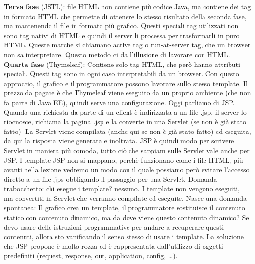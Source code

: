 \textbf{Terva fase} (JSTL): file HTML non contiene più codice Java, ma contiene dei tag in formato HTML che permette di ottenere lo stesso risultato della seconda fase, ma mantenendo il file in formato più grafico. Questi speciali tag utilizzati non sono tag nativi di HTML e quindi il server li processa per trasformarli in puro HTML. Queste marche si chiamano active tag o run-at-server tag, che un browser non sa interpretare. Questo metodo ci da l'illusione di lavorare con HTML.\newline
\newline
\textbf{Quarta fase} (Thymeleaf): Contiene solo tag HTML, che però hanno attributi speciali. Questi tag sono in ogni caso interpretabili da un browser. Con questo approccio, il grafico e il programmatore possono lavorare sullo stesso template. Il prezzo da pagare è che Thymeleaf viene eseguito da un proprio ambiente (che non fa parte di Java EE), quindi serve una configurazione.\newline
\newline
Oggi parliamo di JSP.\newline
\newline
Quando una richiesta da parte di un client è indirizzata a un file .jsp, il server lo riocnosce, richiama la pagina .jsp e la converte in una Servlet (se non è già stato fatto)- La Servlet viene compilata (anche qui se non è già stato fatto) ed eseguita, da qui la risposta viene generata e inoltrata.\newline
JSP è quindi modo per scrivere Servlet in maniera più comoda, tutto ciò che sappiam sulle Servlet vale anche per JSP.\newline
I template JSP non si mappano, perchè funzionano come i file HTML, più avanti nella lezione vedremo un modo con il quale possiamo però evitare l'accesso diretto a un file .jps obbligando il passaggio per una Servlet.\newline
\newline
Domanda trabocchetto: chi esegue i template? nessuno. I template non vengono eseguiti, ma convertiti in Servlet che verranno compilate ed eseguite.\newline
\newline
Nasce una domanda spontanea: Il grafico crea un template, il programmatore sostituisce il contenuto statico con contenuto dinamico, ma da dove viene questo contenuto dinamico? Se devo usare delle istruzioni programmative per andare a recuperare questi contenuti, allora sto vanificando il senso stesso di usare i template. La soluzione che JSP propone è molto rozza ed è rappresentata dall'utilizzo di oggetti predefiniti (request, response, out, application, config, \dots).\newline
